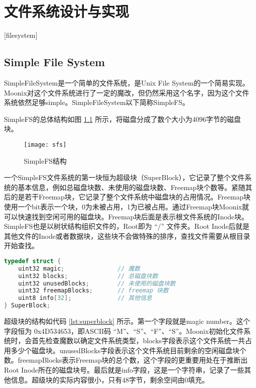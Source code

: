 
\chapter{文件系统设计与实现}[filesystem]
\label{chapter:filesystem}

\section{Simple File System}

SimpleFileSystem是一个简单的文件系统，是Unix File System的一个简易实现。Moonix对这个文件系统进行了一定的魔改，但仍然采用这个名字，因为这个文件系统依然足够simple。SimpleFileSystem以下简称SimpleFS。

SimpleFS的总体结构如图 \ref{pic:sfs} 所示，将磁盘分成了数个大小为4096字节的磁盘块。

\begin{figure}[htpb]
	\centering
	\texttt{[image: sfs]}
	\setlength{\abovecaptionskip}{2pt}
	\caption{SimpleFS结构}
	\label{pic:sfs}
\end{figure}

一个SimpleFS文件系统的第一块恒为超级块（SuperBlock），它记录了整个文件系统的基本信息，例如总磁盘块数、未使用的磁盘块数、Freemap块个数等。紧随其后的是若干Freemap块，它记录了整个文件系统中磁盘块的占用情况。Freemap块使用一个bit表示一个块，0为未被占用，1为已被占用。通过Freemap块Moonix就可以快速找到空闲可用的磁盘块。Freemap块后面是表示根文件系统的Inode块。SimpleFS也是以树状结构组织文件的，Root即为 “/” 文件夹。Root Inode后就是其他文件的Inode或者数据块，这些块不会做特殊的排序，查找文件需要从根目录开始查找。

\begin{lstlisting}[language={C}, caption={SimpleFS超级块结构}, label={lst:superblock}]
typedef struct {
	uint32 magic;               // 魔数
	uint32 blocks;              // 总磁盘块数
	uint32 unusedBlocks;        // 未使用的磁盘块数
	uint32 freemapBlocks;       // freemap 块数
	uint8 info[32];             // 其他信息
} SuperBlock;
\end{lstlisting}

超级块的结构如代码 \ref{lst:superblock} 所示。第一个字段就是magic number。这个字段恒为 0x4D534653，即ASCII码 “M”、“S”、“F”、“S”。Moonix初始化文件系统时，会首先检查魔数以确定文件系统类型，blocks字段表示这个文件系统一共占用多少个磁盘块。unusedBlocks字段表示这个文件系统目前剩余的空闲磁盘块个数。freemapBlocks表示Freemap块的总个数，这个字段的更重要用处在于推断出Root Inode所在的磁盘块号。最后就是info字段，这是一个字符串，记录了一些其他信息。超级块的实际内容很小，只有48字节，剩余空间由0填充。


